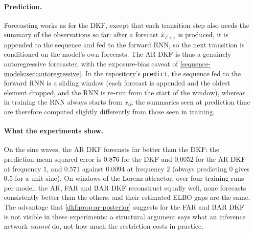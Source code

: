 \begin{notechapter}
\paragraph{Prediction.} Forecasting works as for the DKF, except that each transition step
also needs the summary of the observations so far: after a forecast $\hat x_{T+s}$ is produced, it is
appended to the sequence and fed to the forward RNN, so the next transition is conditioned
on the model's own forecasts. The AR DKF is thus a genuinely autoregressive forecaster, with
the exposure-bias caveat of \cref{sequence-models:sec:autoregressive}. In the repository's
\texttt{predict}, the sequence fed to the forward RNN is a sliding window (each forecast is
appended and the oldest element dropped, and the RNN is re-run from the start of the
window), whereas in training the RNN always starts from $x_0$; the summaries seen at prediction
time are therefore computed slightly differently from those seen in training.

\paragraph{What the experiments show.} On the sine waves, the AR DKF forecasts far better
than the DKF: the prediction mean squared error is $0.876$ for the DKF and $0.0052$ for the AR DKF at
frequency $1$, and $0.571$ against $0.0094$ at frequency $2$ (always predicting $0$ gives $0.5$ for a unit
sine). On windows of the Lorenz attractor, over four training runs per model, the AR, FAR
and BAR DKF reconstruct equally well, none forecasts consistently better than the others,
and their estimated ELBO gaps are the same. The advantage that \cref{dkf:prop:ar-posterior}
suggests for the FAR and BAR DKF is not visible in these experiments: a structural argument
says what an inference network \emph{cannot} do, not how much the restriction costs in practice.


\end{notechapter}
